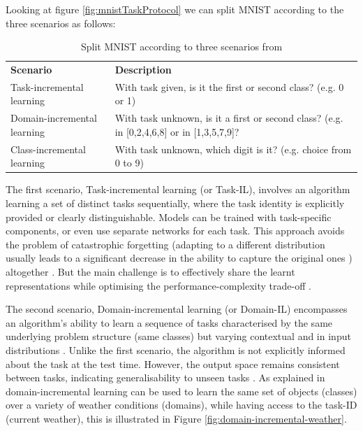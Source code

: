 Looking at figure \ref{fig:mnistTaskProtocol} we can split MNIST according to the three scenarios as follows: 
\begin{table}[H]
\begin{tabularx}{0.9\textwidth}{l | X }
    \textbf{Scenario} & \textbf{Description} \\
     Task-incremental learning & With task given, is it the first or second class? (e.g. 0 or 1)  \\
     Domain-incremental learning & With task unknown, is it a first or second class? (e.g. in [0,2,4,6,8] or in [1,3,5,7,9]?\\
     Class-incremental learning & With task unknown, which digit is it? (e.g. choice from 0 to 9)

\end{tabularx}
     \caption{Split MNIST according to three scenarios from \citep{van2019three}}
     \label{tab:mnist_tasks}
\end{table}
The first scenario, Task-incremental learning (or Task-IL), involves an algorithm learning a set of distinct tasks sequentially, where the task identity is explicitly provided or clearly distinguishable. Models can be trained with task-specific components, or even use separate networks for each task. This approach avoids the problem of catastrophic forgetting (adapting to a different distribution usually leads to a significant decrease in the ability to capture the original ones \citep{wang2023comprehensive}) altogether \citep{ruvolo2013ella, masse2018alleviating}. But the main challenge is to effectively share the learnt representations while optimising the performance-complexity trade-off \citep{lopez2017gradient, vogelstein2020representation}. 

The second scenario, Domain-incremental learning (or Domain-IL) encompasses an algorithm's ability to learn a sequence of tasks characterised by the same underlying problem structure (same classes) but varying contextual and in input distributions \citep{ke2021classic, mirza2022efficient}. Unlike the first scenario, the algorithm is not explicitly informed about the task at the test time. However, the output space remains consistent between tasks, indicating generalisability to unseen tasks \citep{aljundi2017expert}. 
As explained in \citep{mirza2022efficient} domain-incremental learning can be used to learn the same set of objects (classes) over a variety of weather conditions (domains), while having access to the task-ID (current weather), this is illustrated in Figure \ref{fig:domain-incremental-weather}. 


